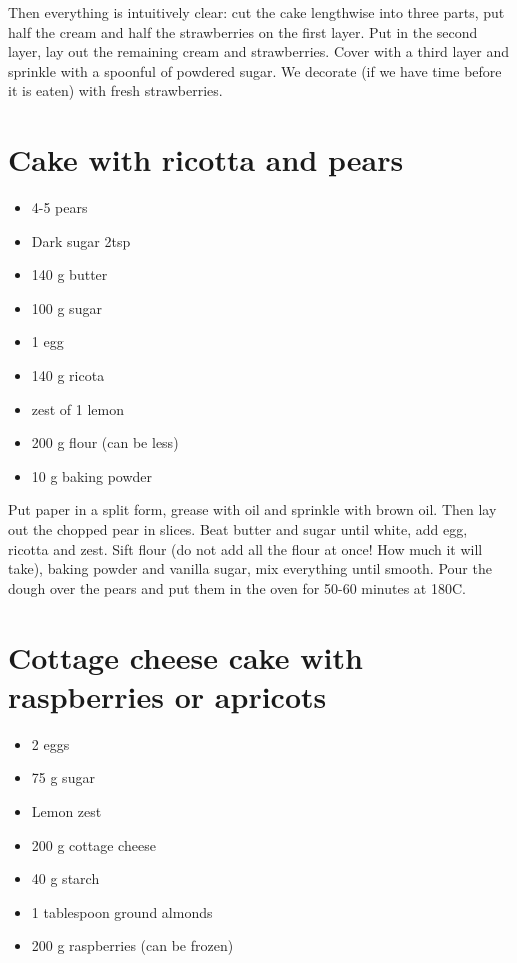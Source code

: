 \documentclass[
]{book}
\providecommand{\tightlist}{%
  \setlength{\itemsep}{0pt}\setlength{\parskip}{0pt}}
\begin{document}
Then everything is intuitively clear: cut the cake lengthwise into three parts, put half the cream and half the strawberries on the first layer. Put in the second layer, lay out the remaining cream and strawberries. Cover with a third layer and sprinkle with a spoonful of powdered sugar. We decorate (if we have time before it is eaten) with fresh strawberries.

\hypertarget{cake-with-ricotta-and-pears}{%
\section{Cake with ricotta and pears}\label{cake-with-ricotta-and-pears}}

\begin{itemize}
\tightlist
\item
  4-5 pears
\item
  Dark sugar 2tsp
\item
  140 g butter
\item
  100 g sugar
\item
  1 egg
\item
  140 g ricota
\item
  zest of 1 lemon
\item
  200 g flour (can be less)
\item
  10 g baking powder
\end{itemize}

Put paper in a split form, grease with oil and sprinkle with brown oil. Then lay out the chopped pear in slices.
Beat butter and sugar until white, add egg, ricotta and zest.
Sift flour (do not add all the flour at once! How much it will take), baking powder and vanilla sugar, mix everything until smooth.
Pour the dough over the pears and put them in the oven for 50-60 minutes at 180C.

\hypertarget{cottage-cheese-cake-with-raspberries-or-apricots}{%
\section{Cottage cheese cake with raspberries or apricots}\label{cottage-cheese-cake-with-raspberries-or-apricots}}

\begin{itemize}
\tightlist
\item
  2 eggs
\item
  75 g sugar
\item
  Lemon zest
\item
  200 g cottage cheese
\item
  40 g starch
\item
  1 tablespoon ground almonds
\item
  200 g raspberries (can be frozen)
\end{itemize}
\end{document}
